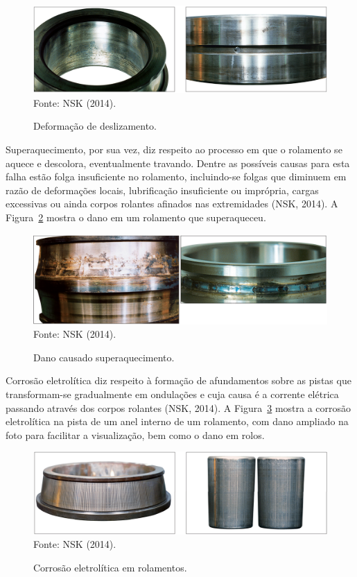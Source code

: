 \documentclass[
	12pt,				
	oneside,			
	a4paper,			
	english,			
	brazil,	
	sumario=abnt-6027-2012		
	]{abntex2ppgsi}
\begin{document}
\begin{figure}[H]
\centering
\caption {Deformação de deslizamento.}
\includegraphics[width=\textwidth,height=\textheight,keepaspectratio]{deslizamento_nsk} \\
Fonte: NSK (2014).
\label{deslizamento_nsk}
\end{figure}

Superaquecimento, por sua vez, diz respeito ao processo em que o rolamento se aquece e descolora, eventualmente travando. Dentre as possíveis causas para esta falha estão folga insuficiente no rolamento, incluindo-se folgas que diminuem em razão de deformações locais, lubrificação insuficiente ou imprópria, cargas excessivas ou ainda corpos rolantes afinados nas extremidades (NSK, 2014). A Figura~\ref{superaquecimento_nsk} mostra o dano em um rolamento que superaqueceu.

\begin{figure}[H]
\centering
\caption {Dano causado superaquecimento.}
\includegraphics[width=\textwidth,height=\textheight,keepaspectratio]{superaquecimento_nsk} \\
Fonte: NSK (2014).
\label{superaquecimento_nsk}
\end{figure}

Corrosão eletrolítica diz respeito à formação de afundamentos sobre as pistas que transformam-se gradualmente em ondulações e cuja causa é a corrente elétrica passando através dos corpos rolantes (NSK, 2014). A Figura~\ref{corrosao_eletrolitica_nsk} mostra a corrosão eletrolítica na pista de um anel interno de um rolamento, com dano ampliado na foto para facilitar a visualização, bem como o dano em rolos. 

\begin{figure}[H]
\centering
\caption {Corrosão eletrolítica em rolamentos.}
\includegraphics[width=\textwidth,height=\textheight,keepaspectratio]{corrosao_eletrolitica_nsk} \\
Fonte: NSK (2014).
\label{corrosao_eletrolitica_nsk}
\end{figure}
\end{document}
